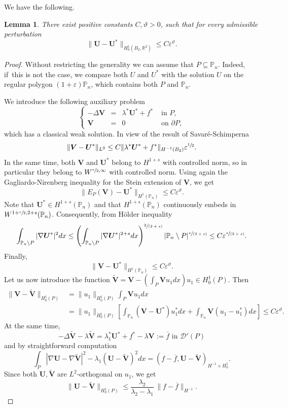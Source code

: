 \documentclass[JEP,XML,SOM,Unicode,ThmDefs,NoFloatCountersInSection,published]{cedram}
\newcommand{\spfrac}[2]{\sfrac{#1}{(#2)}}
\theoremstyle{plain}
\newtheorem{lemma}[thm]{Lemma}
\theoremstyle{definition}
\newcommand{\bo}[1]{{\boldsymbol#1}}
\newcommand{\thetathree}{\vartheta}
\let\Bbb\mathbb
\def\R{\mathbb{R}}
\newcommand{\vps}{\varepsilon}
\newcommand{\lb}{\lambda}
\newcommand{\sm}{\setminus}
\newcommand{\sq}{\subseteq}
\newcommand{\ov}{\overline}
\begin{document}
We have the following.
\begin{lemma} \label{bobu29}
There exist positive constants $C, \thetathree >0$, such that for every admissible perturbation
\[
\|\bo U-\bo U^*\|_{H^1_0(B_2, \R^2)} \le C \vps^\thetathree.
\]
\end{lemma}
\begin{proof}
Without restricting the generality we can assume that $P \sq \Bbb P_n$. Indeed, if~this is not the case, we compare both $U$ and $U^*$ with the solution $U$ on the regular polygon $(1+\vps) \Bbb P_n$, which contains both $P$ and $\Bbb P_n$.

We introduce the following auxiliary problem
\begin{equation}\left\{ \begin{array}{rcll}
-\Delta \bo V & =&\lb^* \bo U^* + f^* & \text{ in }P,\\
\bo V &= &0 & \text{ on }\partial P,
\end{array} \right.
\end{equation}
which has a classical weak solution. In view of the result of Savaré-Schimperna \cite[Th.\,8.5]{SaSc02}
\begin{equation}\label{bobu42}
\|\bo V- \bo U^*\|_{L^2} \le C \| \lb^* \bo U^* + f^*\|_{H^{-1} (B_2)} \varepsilon^{\sfrac 12}.
\end{equation}
In the same time, both $\bo V$ and $\bo U^*$ belong to $H^{1+s}$ with controlled norm, so in particular they belong to $W^{\sfrac s2, \infty}$ with controlled norm. Using again the Gagliardo-Nirenberg inequality for the Stein extension of $\bo V$, we get
\[
\|E_P(\bo V)- \bo U^*\|_{H^1(\Bbb P_n)} \le C \vps^\thetathree.
\]
Note that $\bo U^* \!\in\! H^{1+s} (\Bbb P_n)$ and that $H^{1+s} (\Bbb P_n)$ continuously embeds in $W^{1+\sfrac s2, 2+s} (\Bbb P_n)$. Consequently, from Hölder inequality
\[
\int_{\Bbb P_n \sm P} |\nabla \bo U^* |^2 dx \le \left(\int_{\Bbb P_n \sm P} |\nabla \bo U^* |^{2+s} dx\right)^{\spfrac{2}{2+s}} | \Bbb P_n \sm P|^ {\spfrac{s}{2+s}} \le C\vps^{\spfrac{s}{2+s}}.
\]
Finally,
\[
\|\bo V- \bo U^*\|_{H^1(\Bbb P_n)} \le C \vps^\thetathree.
\]
Let us now introduce the function
$\tilde{\bo{V}}= \bo V - (\int_P \bo Vu_1 dx)u_1\in H^1_0(P)$. Then
\begin{align*} \|\bo V-\tilde{\bo{V}} \|_{H^1_0(P)} & = \|u_1\|_{H^1_0(P)} \int _P \bo Vu_1 dx \\
& = \|u_1\|_{H^1_0(P)}\left[\int_{\Bbb P_n} (\bo V- \bo U^*)u_1^* dx + \int_{\mathbb P_n} \bo V(u_1-u_1^*) dx\right]\le C \vps^\thetathree.
\end{align*}
At the same time,
\[
-\Delta \tilde{\bo{V}} - \lb \tilde{\bo{V}}= \lb_1^* \bo U^* +f^*-\lb\bo V := \ov f \mbox{ in } {\mathcal D}'(P)
\]
and by straightforward computation
\[
\int_{P} |\nabla \bo U -\nabla \tilde{\bo{V}} |^2 - \lb_1 (\bo U -\tilde{\bo{V}})^2 dx = (f -\ov f, \bo U -\tilde{\bo{V}})_{H^{-1}\times H_0^1}.
\]
Since both $ \bo U, \tilde{\bo{V}}$ are $L^2$-orthogonal on $u_1$, we get
\[
\| \bo U -\tilde{\bo{V}} \|_{H^1_0(P)} \le \frac{\lb_2}{\lb_2-\lb_1}\, \| f -\ov f\| _{H^{-1}}.
\]


\end{proof}
\end{document}
